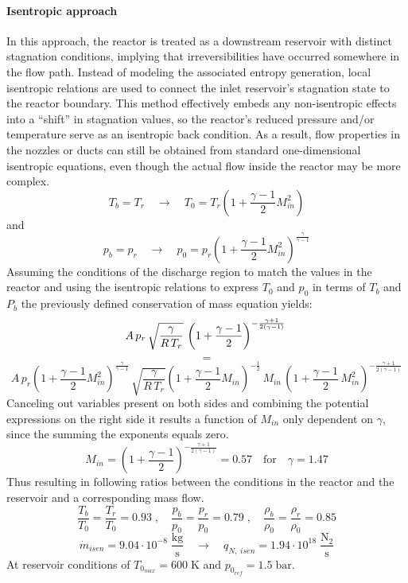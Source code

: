 \paragraph{Isentropic approach}
	In this approach, the reactor is treated as a downstream reservoir with distinct stagnation conditions, implying that irreversibilities have occurred somewhere in the flow path.
	Instead of modeling the associated entropy generation, local isentropic relations are used to connect the inlet reservoir’s stagnation state to the reactor boundary.
	This method effectively embeds any non-isentropic effects into a “shift” in stagnation values, so the reactor’s reduced pressure and/or temperature serve as an isentropic back condition.
	As a result, flow properties in the nozzles or ducts can still be obtained from standard one-dimensional isentropic equations, even though the actual flow inside the reactor may be more complex.
	$$
		T_b = T_r
		\quad \to \quad
		T_0 = T_r \left(1 + \frac{\gamma - 1}{2}M_{in}^2 \right)
	$$
	and
	$$
		p_b = p_r
		\quad \to \quad
		p_0 = p_r \left(1 + \frac{\gamma - 1}{2}M_{in}^2 \right)^{\frac{\gamma}{\gamma - 1}}
	$$
	\newpage
	Assuming the conditions of the discharge region to match the values in the reactor and using the isentropic relations to express $T_0$ and $p_0$ in terms of $T_b$ and $P_b$ the previously defined conservation of mass equation yields:
	$$
		A\, p_r\, \sqrt{\frac{\gamma}{R\,T_r}}\,\left(1+\frac{\gamma-1}{2}\right)^{-\frac{\gamma+1}{2(\gamma-1)}}\\
	$$
	$$
		=
	$$
	$$
		A\, p_r\left(1 + \frac{\gamma - 1}{2}M_{in}^2\right)^{\frac{\gamma}{\gamma-1}}\, \sqrt{\frac{\gamma}{R\,T_r}}\left(1 + \frac{\gamma - 1}{2}M_{in}\right)^{-\frac{1}{2}}\, M_{in}\,\left(1+\frac{\gamma-1}{2}\,M_{in}^2\right)^{-\frac{\gamma+1}{2(\gamma-1)}}
	$$
	Canceling out variables present on both sides and combining the potential expressions on the right side it results a function of $M_{in}$ only dependent on $\gamma$, since the summing the exponents equals zero.
	$$
		M_{in} = \left(1 + \frac{\gamma - 1}{2}\right)^{-\frac{\gamma + 1}{2(\gamma - 1)}}= 0.57
		\quad \text{for} \quad \gamma = 1.47
	$$
	Thus resulting in following ratios between the conditions in the reactor and the reservoir and a corresponding mass flow.
	$$
		\frac{T_b}{T_0} = \frac{T_r}{T_0} = 0.93\;,
			\quad
		\frac{p_b}{p_0} = \frac{p_r}{p_0} = 0.79\;,
			\quad
		\frac{\rho_b}{\rho_0} = \frac{\rho_r}{\rho_0} = 0.85
	$$
	$$
		\dot{m}_{isen} = 9.04 \cdot 10^{-8}\; \frac{\text{kg}}{\text{s}}
			\quad \rightarrow \quad
		q_{N,\;isen} = 1.94 \cdot 10^{18}\; \frac{\text{N}_2}{\text{s}} 
	$$
	At reservoir conditions of $T_{0_{max}} = 600\;\text{K}$ and $p_{0_{ref}} = 1.5\;\text{bar}$.

